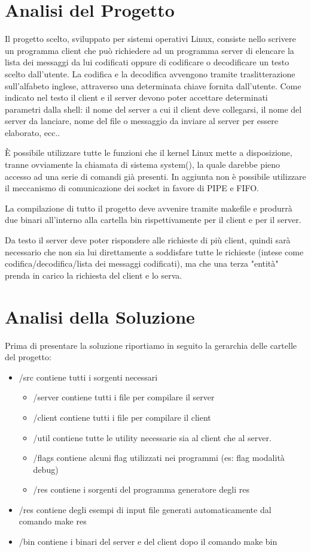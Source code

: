 \documentclass[12pt]{article}
\begin{document}


\section{Analisi del Progetto}
Il progetto scelto, sviluppato per sistemi operativi Linux, consiste nello scrivere un programma client che può richiedere ad un programma server di elencare la lista dei messaggi da lui codificati oppure di codificare o decodificare un testo scelto dall'utente. La codifica e la decodifica avvengono tramite traslitterazione sull'alfabeto inglese, attraverso una determinata chiave fornita dall'utente. Come indicato nel testo il client e il server devono poter accettare determinati parametri dalla shell: il nome del server a cui il client deve collegarsi, il nome del server da lanciare, nome del file o messaggio da inviare al server per essere elaborato, ecc..

È possibile utilizzare tutte le funzioni che il kernel Linux mette a disposizione, tranne ovviamente la chiamata di sistema system(), la quale darebbe pieno accesso ad una serie di comandi già presenti. In aggiunta non è possibile utilizzare il meccanismo di comunicazione dei socket in favore di PIPE e FIFO.

La compilazione di tutto il progetto deve avvenire tramite makefile e produrrà due binari all'interno alla cartella bin rispettivamente per il client e per il server.

Da testo il server deve poter rispondere alle richieste di più client, quindi sarà necessario che non sia lui direttamente a soddisfare tutte le richieste (intese come codifica/decodifica/lista dei messaggi codificati), ma che una terza "entità" prenda in carico la richiesta del client e lo serva.

\section{Analisi della Soluzione}
Prima di presentare la soluzione riportiamo in seguito la gerarchia delle cartelle del progetto:
\begin{itemize}
    \item /src contiene tutti i sorgenti necessari
    \begin{itemize}
        \item /server contiene tutti i file per compilare il server
        \item /client contiene tutti i file per compilare il client
        \item /util contiene tutte le utility necessarie sia al client che al server.
        \item /flags contiene alcuni flag utilizzati nei programmi (es: flag modalità debug)
        \item /res contiene i sorgenti del programma generatore degli res
    \end{itemize}
    \item /res contiene degli esempi di input file generati automaticamente dal comando make res
    \item /bin contiene i binari del server e del client dopo il comando make bin
\end{itemize}
\end{document}
